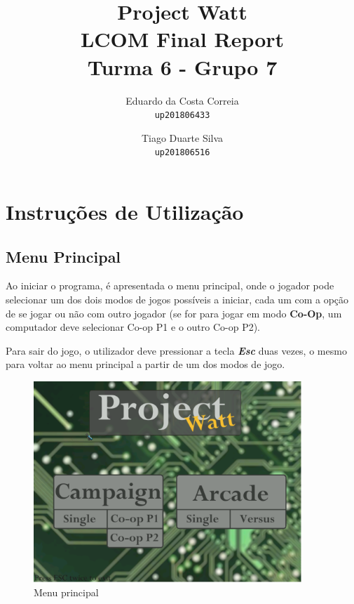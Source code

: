 \documentclass{report}
\begin{document}
\title{\textbf{Project Watt} \\ LCOM Final Report \\ Turma 6 - Grupo 7}
\author{Eduardo da Costa Correia\\
\texttt{up201806433}
\and
Tiago Duarte Silva\\
\texttt{up201806516}}   
\maketitle

\tableofcontents

\chapter{Instruções de Utilização} 

\section{Menu Principal}

Ao iniciar o programa, é apresentada o menu principal, onde o jogador pode selecionar um dos dois modos de jogos possíveis a iniciar, cada um com a opção de se jogar ou não com outro jogador (se for para jogar em modo \textbf{Co-Op}, um computador deve selecionar Co-op P1 e o outro Co-op P2).

Para sair do jogo, o utilizador deve pressionar a tecla \textbf{\textit{Esc}} duas vezes, o mesmo para voltar ao menu principal a partir de um dos modos de jogo.

\begin{figure}[H]
	\centering
	\includegraphics[width=0.9\textwidth]{main_menu}
	\caption{Menu principal}
\end{figure}
\end{document}

